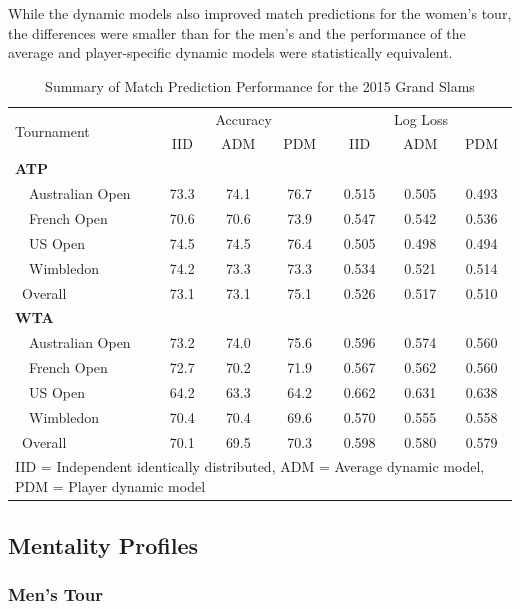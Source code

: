 \documentclass{Latex/svjour3}
\begin{document}
While the dynamic models also improved match predictions for the women's tour,
the differences were smaller than for the men's and the performance of the
average and player-specific dynamic models were statistically equivalent.

\begin{table} \centering
\caption{Summary of Match Prediction Performance for the 2015 Grand Slams}
\begin{tabular}{l ccc ccc} \hline
\multirow{2}{*}{Tournament} & \multicolumn{3}{c}{Accuracy} & \multicolumn{3}{c}{Log Loss} \\ 
&	IID &ADM &PDM &IID &ADM &PDM \\ \hline
\textbf{ATP} & & & & & & \\
~~Australian Open	&73.3&	74.1&	76.7&	0.515&	0.505	&0.493\\
~~French Open	        &70.6&	70.6&	73.9&	0.547&	0.542	&0.536\\
~~US Open	        &74.5&	74.5&	76.4&	0.505&	0.498&	0.494\\
~~Wimbledon	        &74.2&	73.3&	73.3&	0.534&	0.521&	0.514\\
~Overall	        &73.1&	73.1&	75.1&	0.526&	0.517&	0.510\\
\textbf{WTA}  & & & & & & \\
~~Australian Open	&73.2&	74.0&	75.6&	0.596&	0.574&	0.560\\
~~French Open	        &72.7&	70.2&	71.9&	0.567&	0.562&	0.560\\
~~US Open	        &64.2&	63.3&	64.2&	0.662&	0.631&	0.638\\
~~Wimbledon	        &70.4&	70.4&	69.6&	0.570&	0.555&	0.558\\
~Overall	        &70.1&	69.5&	70.3&	0.598	&0.580& 0.579\\ \hline
\multicolumn{7}{p{3.8in}}{IID = Independent identically distributed, ADM =
  Average dynamic model, PDM = Player dynamic model}
\end{tabular}
\label{tab:performance}
\end{table}

\subsection{Mentality Profiles}

\subsubsection{Men's Tour}
\end{document}
